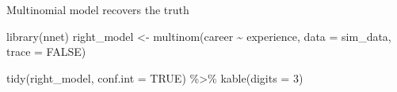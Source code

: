 \documentclass[
  ignorenonframetext,
]{beamer}
\newenvironment{Shaded}{\begin{snugshade}}{\end{snugshade}}
\newcommand{\AttributeTok}[1]{\textcolor[rgb]{0.40,0.45,0.13}{#1}}
\newcommand{\ConstantTok}[1]{\textcolor[rgb]{0.56,0.35,0.01}{#1}}
\newcommand{\DecValTok}[1]{\textcolor[rgb]{0.68,0.00,0.00}{#1}}
\newcommand{\FunctionTok}[1]{\textcolor[rgb]{0.28,0.35,0.67}{#1}}
\newcommand{\NormalTok}[1]{\textcolor[rgb]{0.00,0.23,0.31}{#1}}
\newcommand{\OtherTok}[1]{\textcolor[rgb]{0.00,0.23,0.31}{#1}}
\newcommand{\SpecialCharTok}[1]{\textcolor[rgb]{0.37,0.37,0.37}{#1}}
\begin{document}
\begin{frame}[fragile]{Multinomial model recovers the truth}
\label{multinomial-model-recovers-the-truth}
\begin{Shaded}
\begin{Highlighting}[]
\FunctionTok{library}\NormalTok{(nnet)}
\NormalTok{right\_model }\OtherTok{\textless{}{-}} \FunctionTok{multinom}\NormalTok{(career }\SpecialCharTok{\textasciitilde{}}\NormalTok{ experience, }\AttributeTok{data =}\NormalTok{ sim\_data, }\AttributeTok{trace =} \ConstantTok{FALSE}\NormalTok{)}

\FunctionTok{tidy}\NormalTok{(right\_model, }\AttributeTok{conf.int =} \ConstantTok{TRUE}\NormalTok{) }\SpecialCharTok{\%\textgreater{}\%}
  \FunctionTok{kable}\NormalTok{(}\AttributeTok{digits =} \DecValTok{3}\NormalTok{)}
\end{Highlighting}
\end{Shaded}


\end{frame}
\end{document}
